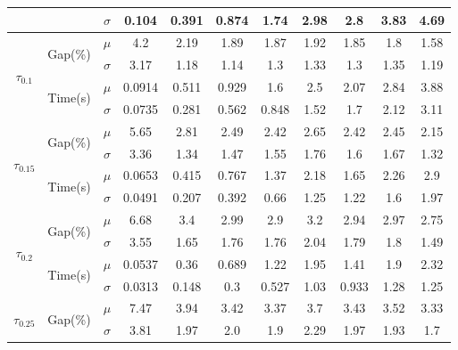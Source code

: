 \documentclass[spanish, a4paper, 12pt, openany,final]{book}
\begin{document}
\begin{table}[h]
\begin{adjustbox}{width=\columnwidth,center}
\begin{tabular}{|ccc|cccccccc|}
			&                                                         & $\sigma$ & 0.104 & 0.391 & 0.874 & 1.74 & 2.98 & 2.8 & 3.83 & 4.69 \\
			\hline
			\multirow{4}{*}{$\tau_{0.1}$} & \multirow{2}{*}{Gap(\%)}  & $\mu$    & 4.2 & 2.19 & 1.89 & 1.87 & 1.92 & 1.85 & 1.8 & 1.58\\
			&                                                         & $\sigma$ & 3.17 & 1.18 & 1.14 & 1.3 & 1.33 & 1.3 & 1.35 & 1.19 \\
			\cline{3-11}
			& \multirow{2}{*}{Time(s)}                                & $\mu$    & 0.0914 & 0.511 & 0.929 & 1.6 & 2.5 & 2.07 & 2.84 & 3.88\\
			&                                                         & $\sigma$ & 0.0735 & 0.281 & 0.562 & 0.848 & 1.52 & 1.7 & 2.12 & 3.11 \\
			\hline
			\multirow{4}{*}{$\tau_{0.15}$} & \multirow{2}{*}{Gap(\%)} & $\mu$    & 5.65 & 2.81 & 2.49 & 2.42 & 2.65 & 2.42 & 2.45 & 2.15\\
			&                                                         & $\sigma$ & 3.36 & 1.34 & 1.47 & 1.55 & 1.76 & 1.6 & 1.67 & 1.32 \\
			\cline{3-11}
			& \multirow{2}{*}{Time(s)}                                & $\mu$    & 0.0653 & 0.415 & 0.767 & 1.37 & 2.18 & 1.65 & 2.26 & 2.9\\
			&                                                         & $\sigma$ & 0.0491 & 0.207 & 0.392 & 0.66 & 1.25 & 1.22 & 1.6 & 1.97 \\
			\hline
			\multirow{4}{*}{$\tau_{0.2}$} & \multirow{2}{*}{Gap(\%)}  & $\mu$    & 6.68 & 3.4 & 2.99 & 2.9 & 3.2 & 2.94 & 2.97 & 2.75\\
			&                                                         & $\sigma$ & 3.55 & 1.65 & 1.76 & 1.76 & 2.04 & 1.79 & 1.8 & 1.49 \\
			\cline{3-11}
			& \multirow{2}{*}{Time(s)} 								  & $\mu$    & 0.0537 & 0.36 & 0.689 & 1.22 & 1.95 & 1.41 & 1.9 & 2.32\\
			&                                                   	  & $\sigma$ & 0.0313 & 0.148 & 0.3 & 0.527 & 1.03 & 0.933 & 1.28 & 1.25 \\
			\hline
			\multirow{4}{*}{$\tau_{0.25}$} & \multirow{2}{*}{Gap(\%)} & $\mu$    & 7.47 & 3.94 & 3.42 & 3.37 & 3.7 & 3.43 & 3.52 & 3.33\\
			&                                                   	  & $\sigma$ & 3.81 & 1.97 & 2.0 & 1.9 & 2.29 & 1.97 & 1.93 & 1.7 \\

\end{tabular}
\end{adjustbox}
\end{table}
\end{document}
